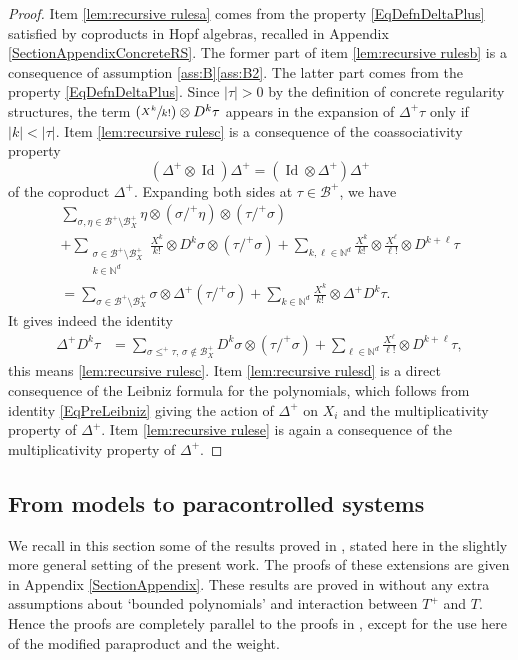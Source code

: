\documentclass[10pt]{amsart}
\newcommand{\Psfrac}[2]{(\sfrac{#1}{#2})}
\theoremstyle{plain}
\theoremstyle{definition}
\DeclareMathOperator{\iden}{Id}
\newcommand{\bbN}{\mathbb{N}}
\newcommand{\mcB}{\mathcal{B}}
\begin{document}
\begin{proof}
Item \eqref{lem:recursive rulesa} comes from the property \eqref{EqDefnDeltaPlus} satisfied by coproducts in Hopf algebras, recalled in Appendix \ref{SectionAppendixConcreteRS}. The former part of item \eqref{lem:recursive rulesb} is a consequence of assumption \ref{ass:B}\eqref{ass:B2}.
The latter part comes from the property \eqref{EqDefnDeltaPlus}. Since $|\tau|>0$ by the definition of concrete regularity structures, the term $\Psfrac{X^k}{k!}\otimes D^k\tau$ appears in the expansion of $\Delta^+\tau$ only if $|k|<|\tau|$.
Item \eqref{lem:recursive rulesc} is a consequence of the coassociativity property
\[
(\Delta^+\otimes\iden)\Delta^+ = (\iden\otimes\Delta^+)\Delta^+
\]
of the coproduct $\Delta^+$. Expanding both sides at $\tau\in\mcB^+$, we have
\begin{multline*}
\sum_{\sigma,\eta\in\mcB^+\setminus\mcB_X^+}\eta\otimes(\sigma/^+\eta)\otimes(\tau/^+\sigma)\\[-10pt]
+\sum_{\substack{\sigma\in\mcB^+\setminus\mcB_X^+\\k\in\bbN^d}}\frac{X^k}{k!}\otimes D^k\sigma\otimes(\tau/^+\sigma)
+\sum_{k,\ell\in\bbN^d}\frac{X^k}{k!}\otimes\frac{X^\ell}{\ell!}\otimes D^{k+\ell}\tau\\[-10pt]
=\sum_{\sigma\in\mcB^+\setminus\mcB_X^+}\sigma\otimes\Delta^+(\tau/^+\sigma)
+\sum_{k\in\bbN^d}\frac{X^k}{k!}\otimes \Delta^+D^k\tau.
\end{multline*}
It gives indeed the identity
\begin{align}
\label{defi:D^ktau}
\Delta^+D^k\tau &= \sum_{\sigma\leq^+\tau,\, \sigma\notin\mcB_X^+}D^k\sigma\otimes(\tau/^+\sigma) + \sum_{\ell\in\bbN^d}\frac{X^{\ell}}{\ell!}\otimes D^{k+\ell}\tau,
\end{align}
this means \eqref{lem:recursive rulesc}. Item \eqref{lem:recursive rulesd} is a direct consequence of the Leibniz formula for the polynomials, which follows from identity \eqref{EqPreLeibniz} giving the action of $\Delta^+$ on $X_i$ and the multiplicativity property of $\Delta^+$. Item \eqref{lem:recursive rulese} is again a consequence of the multiplicativity property of $\Delta^+$.
\end{proof}

\subsection{From models to paracontrolled systems}
\label{SubsectionFromModelsToPCSystems}

We recall in this section some of the results proved in \cite{BH}, stated here in the slightly more general setting of the present work.
The proofs of these extensions are given in Appendix \ref{SectionAppendix}. These results are proved in \cite[\S\S2\,\&\,3]{BH} without any extra assumptions about `bounded polynomials' and interaction between $T^+$ and $T$. Hence the proofs are completely parallel to the proofs in \cite{BH}, except for the use here of the modified paraproduct and the weight.
\end{document}
